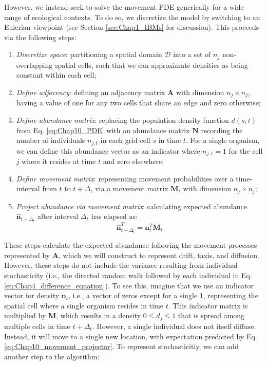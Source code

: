 However, we instead seek to solve the movement PDE generically for a wide range of ecological contexts.  To do so, we discretize the model by switching to an Eulerian viewpoint (see Section \ref{sec:Chap1_IBMs} for discussion).  This proceeds via the following steps:
\begin{enumerate}
    \item \textit{Discretize space}: partitioning a spatial domain \( \mathcal{D} \) into a set of \( n_j \) non-overlapping spatial cells, such that we can approximate densities as being constant within each cell; 
    
    \item \textit{Define adjacency}:  defining an adjacency matrix \(\mathbf A\) with dimension \( n_j \times n_j \), having a value of one for any two cells that share an edge and zero otherwise;

    \item \textit{Define abundance matrix}: replacing the population density function \(d(s,t)\) from Eq. \ref{eq:Chap10_PDE} with an abundance matrix \(\mathbf{N}\) recording the number of individuals \( n_{j,t} \) in each grid cell \(s\) in time \(t\).  For a single organism, we can define this abundance vector as an indicator where \( n_{j,t} = 1 \) for the cell \(j\) where it resides at time \(t\) and zero elsewhere;

    \item \textit{Define movement matrix}: representing movement probabilities over a time-interval from \(t\) to \(t+\Delta_t\) via a movement matrix \(\mathbf{M}_t\) with dimension \( n_j \times n_j \);

    \item \textit{Project abundance via movement matrix}: calculating expected abundance \(\hat{\mathbf{n}}_{t+\Delta_t}\) after interval \(\Delta_t\) has elapsed as:
\begin{equation} \label{eq:Chap10_movement_projector}
   \hat{\mathbf{n}}_{t+\Delta_t}^T = \mathbf{n}_t^T \mathbf{M}_t 
\end{equation}
\end{enumerate}
These steps calculate the expected abundance following the movement processes represented by \(\mathbf{A}\), which we will construct to represent drift, taxis, and diffusion.  However, these steps do not include the variance resulting from individual stochasticity (i.e., the directed random walk followed by each individual in Eq. \ref{eq:Chap4_difference_equation}).  To see this, imagine that we use an indicator vector for density \(\mathbf{n}_t\), i.e., a vector of zeros except for a single 1, representing the spatial cell where a single organism resides in time \(t\).  This indicator matrix is multiplied by \(\mathbf{M}\), which results in a density \( 0 \leq d_j \leq 1 \) that is spread among multiple cells in time \(t+\Delta_t\).  However, a single individual does not itself diffuse.  Instead, it will move to a single new location, with expectation predicted by Eq. \ref{eq:Chap10_movement_projector}.  To represent stochasticitiy, we can add another step to the algorithm:

